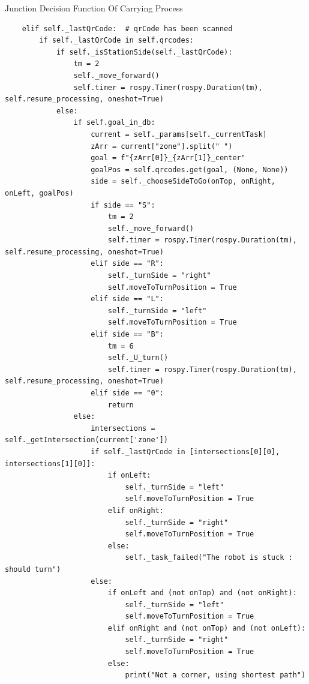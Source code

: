\documentclass[../../main]{subfiles}
\begin{document}
\begin{codebox}[label=judeFig37]{Junction Decision Function Of Carrying Process}
\begin{verbatim}
    elif self._lastQrCode:  # qrCode has been scanned
        if self._lastQrCode in self.qrcodes:  
            if self._isStationSide(self._lastQrCode):
                tm = 2
                self._move_forward()        
                self.timer = rospy.Timer(rospy.Duration(tm), self.resume_processing, oneshot=True)
            else:
                if self.goal_in_db:
                    current = self._params[self._currentTask]
                    zArr = current["zone"].split(" ")
                    goal = f"{zArr[0]}_{zArr[1]}_center"
                    goalPos = self.qrcodes.get(goal, (None, None))
                    side = self._chooseSideToGo(onTop, onRight, onLeft, goalPos)
                    if side == "S":
                        tm = 2
                        self._move_forward()        
                        self.timer = rospy.Timer(rospy.Duration(tm), self.resume_processing, oneshot=True)
                    elif side == "R":
                        self._turnSide = "right"
                        self.moveToTurnPosition = True
                    elif side == "L":
                        self._turnSide = "left"
                        self.moveToTurnPosition = True
                    elif side == "B":
                        tm = 6
                        self._U_turn()         
                        self.timer = rospy.Timer(rospy.Duration(tm), self.resume_processing, oneshot=True)
                    elif side == "0":
                        return
                else:  
                    intersections = self._getIntersection(current['zone']) 
                    if self._lastQrCode in [intersections[0][0], intersections[1][0]]: 
                        if onLeft:                  
                            self._turnSide = "left"
                            self.moveToTurnPosition = True
                        elif onRight:
                            self._turnSide = "right"
                            self.moveToTurnPosition = True
                        else: 
                            self._task_failed("The robot is stuck : should turn") 
                    else: 
                        if onLeft and (not onTop) and (not onRight):
                            self._turnSide = "left"
                            self.moveToTurnPosition = True
                        elif onRight and (not onTop) and (not onLeft): 
                            self._turnSide = "right"
                            self.moveToTurnPosition = True
                        else: 
                            print("Not a corner, using shortest path")

\end{verbatim}
\end{codebox}
\end{document}
